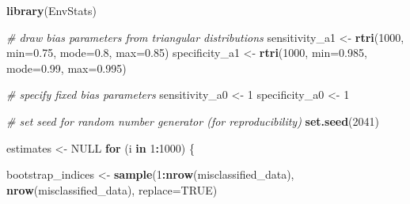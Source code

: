 \documentclass[
]{book}
\newenvironment{Shaded}{\begin{snugshade}}{\end{snugshade}}
\newcommand{\AttributeTok}[1]{\textcolor[rgb]{0.13,0.29,0.53}{#1}}
\newcommand{\CommentTok}[1]{\textcolor[rgb]{0.56,0.35,0.01}{\textit{#1}}}
\newcommand{\ConstantTok}[1]{\textcolor[rgb]{0.56,0.35,0.01}{#1}}
\newcommand{\ControlFlowTok}[1]{\textcolor[rgb]{0.13,0.29,0.53}{\textbf{#1}}}
\newcommand{\DecValTok}[1]{\textcolor[rgb]{0.00,0.00,0.81}{#1}}
\newcommand{\FloatTok}[1]{\textcolor[rgb]{0.00,0.00,0.81}{#1}}
\newcommand{\FunctionTok}[1]{\textcolor[rgb]{0.13,0.29,0.53}{\textbf{#1}}}
\newcommand{\NormalTok}[1]{#1}
\newcommand{\OtherTok}[1]{\textcolor[rgb]{0.56,0.35,0.01}{#1}}
\newcommand{\SpecialCharTok}[1]{\textcolor[rgb]{0.81,0.36,0.00}{\textbf{#1}}}
\begin{document}
\begin{Shaded}
\begin{Highlighting}[]
\FunctionTok{library}\NormalTok{(EnvStats)}

\CommentTok{\# draw bias parameters from triangular distributions}
\NormalTok{sensitivity\_a1 }\OtherTok{\textless{}{-}} \FunctionTok{rtri}\NormalTok{(}\DecValTok{1000}\NormalTok{, }\AttributeTok{min=}\FloatTok{0.75}\NormalTok{, }\AttributeTok{mode=}\FloatTok{0.8}\NormalTok{, }\AttributeTok{max=}\FloatTok{0.85}\NormalTok{)}
\NormalTok{specificity\_a1 }\OtherTok{\textless{}{-}} \FunctionTok{rtri}\NormalTok{(}\DecValTok{1000}\NormalTok{, }\AttributeTok{min=}\FloatTok{0.985}\NormalTok{, }\AttributeTok{mode=}\FloatTok{0.99}\NormalTok{, }\AttributeTok{max=}\FloatTok{0.995}\NormalTok{)}

\CommentTok{\# specify fixed bias parameters}
\NormalTok{sensitivity\_a0 }\OtherTok{\textless{}{-}}  \DecValTok{1}
\NormalTok{specificity\_a0 }\OtherTok{\textless{}{-}} \DecValTok{1}

\CommentTok{\# set seed for random number generator (for reproducibility)}
\FunctionTok{set.seed}\NormalTok{(}\DecValTok{2041}\NormalTok{)}

\NormalTok{estimates }\OtherTok{\textless{}{-}} \ConstantTok{NULL}
\ControlFlowTok{for}\NormalTok{ (i }\ControlFlowTok{in} \DecValTok{1}\SpecialCharTok{:}\DecValTok{1000}\NormalTok{) \{}
  
\NormalTok{  bootstrap\_indices }\OtherTok{\textless{}{-}} \FunctionTok{sample}\NormalTok{(}\DecValTok{1}\SpecialCharTok{:}\FunctionTok{nrow}\NormalTok{(misclassified\_data), }\FunctionTok{nrow}\NormalTok{(misclassified\_data), }\AttributeTok{replace=}\ConstantTok{TRUE}\NormalTok{)}
  

\end{Highlighting}
\end{Shaded}
\end{document}
